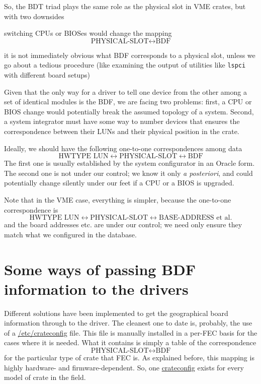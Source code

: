 \documentclass[a4paper]{article}
\newcommand\fname[1]{\texttt{#1}}
\begin{document}
So, the BDT triad plays the same role as the physical slot in VME
crates, but with two downsides
\begin{compactitem}
\item switching CPUs or BIOSes would change the mapping
\begin{equation*}
\text{PHYSICAL-SLOT} \leftrightarrow \text{BDF}
\end{equation*}
\item it is not immediately obvious what BDF corresponds to a physical
slot, unless we go about a tedious procedure (like examining the
output of utilities like \fname{lspci} with different board setups)
\end{compactitem}
Given that the only way for a driver to tell one device from the other
among a set of identical modules is the BDF, we are facing two problems:
first, a CPU or BIOS change would potentially break the assumed topology
of a system. Second, a system integrator must have some way to number
devices that ensures the correspondence between their LUNs and their
physical position in the crate.

Ideally, we should have the following one-to-one correspondences among data
\begin{equation*}
	\text{HWTYPE LUN} \leftrightarrow
	\text{PHYSICAL-SLOT} \leftrightarrow
	\text{BDF}
\end{equation*}
The first one is usually established by the system configurator in an
Oracle form. The second one is not under our control; we know it only
\emph{a posteriori}, and could potentially change silently
under our feet if a CPU or a BIOS is upgraded.

Note that in the VME case, everything is simpler, because the one-to-one
correspondence is
\begin{equation*}
	\text{HWTYPE LUN} \leftrightarrow
	\text{PHYSICAL-SLOT} \leftrightarrow
	\text{BASE-ADDRESS et al.}
\end{equation*}
and the board addresses etc. are under our control; we need only ensure
they match what we configured in the database.

\section{Some ways of passing BDF information to the drivers}
\label{crateconfigs}

Different solutions have been implemented to get the geographical board
information through to the driver. The cleanest one to date is,
probably, the use of a \url{/etc/crateconfig} file. This file is
manually installed in a per-FEC basis for the cases where it is needed.
What it contains is simply a table of the correspondence
\begin{equation*}
	\text{PHYSICAL-SLOT} \leftrightarrow \text{BDF}
\end{equation*}
for the particular type of crate that FEC is. As explained before, this
mapping is highly hardware- and firmware-dependent. So, one
\url{crateconfig} exists for every model of crate in the field.
\end{document}
